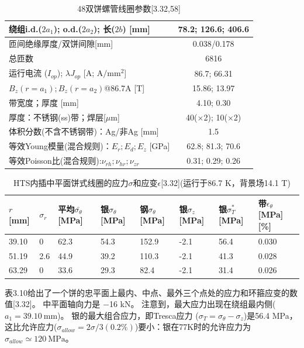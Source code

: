 \begin{table}[htbp]\small
\centering
\caption{48双饼螺管线圈参数[3.32,58]}
\begin{tabular}{|l||c|}
\hline
绕组i.d.($2a_1$); o.d.($2a_2$); 长($2b$) [mm] & 78.2; 126.6; 406.6 \\ \hline
匝间绝缘厚度/双饼间隙[mm] & 0.038/0.178 \\ 
总匝数 & 6816 \\ 
运行电流 ($I_{op}$); $\lambda J_{op}$ [A; $\mathrm{A/mm^2}$] & 86.7; 66.31 \\ 
$B_z(r=a_1);B_z(r=a_2)$@86.7A [T] & 15.86; 13.97 \\ \hline
带宽度；厚度 [mm] & 4.10; 0.30 \\ 
厚度：不锈钢(ss)带；焊层[$\mu$m] & 40($\times$2); 10($\times$2) \\ 
体积分数(不含不锈钢带)：Ag/非Ag {[}mm{]} & 1.5 \\ 
等效Young模量(混合规则)：$E_r; E_d; E_z$ {[}GPa{]} & 62.8; 81.3; 70.6 \\ 
等效Poisson比(混合规则):$\nu_{rh}; \nu_{hr}; \nu_{zr}$ & 0.31; 0.29; 0.26 \\ \hline
\end{tabular}
\end{table}

\begin{table}[htbp]\small
\centering
\caption{HTS内插中平面饼式线圈的应力$\sigma$和应变$\epsilon$[3.32](运行于86.7 K，背景场14.1 T)}
	\begin{tabular}{|l|l|l|l|l|l|l|l|}
\hline
$r${[}mm{]} & $\sigma_r$ & 平均$\bar{\sigma_\theta}$[MPa] & 银$\sigma_\theta$[MPa] & 钢$\sigma_\theta$[MPa] & 银$\sigma_z$[MPa] &银$\sigma_{T}^{*}$[MPa] & 带$\epsilon_\theta$[MPa] [\%] \\ \hline\hline
39.10 & 0 & 62.3 & 54.3 & 152.9 & -2.1 & 56.4 & 0.030 \\ \hline
51.19 & 2.6 & 44.9 & 39.2 & 110.3 & -2.1 & 41.3 & 0.028 \\ \hline
63.29 & 0 & 33.6 & 29.3 & 82.4 & -2.1& 31.4 & 0.026 \\ \hline

\end{tabular}
\end{table}

表3.10给出了一个饼的忠平面上最内、中点、最外三个点处的应力和环箍应变的数值[3.32]。
中平面轴向力是 −16 kN。
注意到，最大应力出现在绕组最内侧($a_1 =39.10\ \mathrm{mm}$)。
银的最大组合应力，即Tresca应力 ($\sigma_T= \sigma_{\theta} −\sigma_z$)是56.4 MPa，
这比允许应力($\sigma_{allow}=2\sigma/3(0.2\%)$)要小：银在77K时的允许应力为$\sigma_{allow}\simeq 120\ \mathrm{MPa}$。

